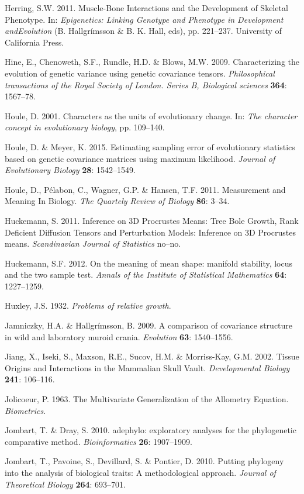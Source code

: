 \documentclass[12pt,twoside]{report}
\begin{document}
Herring, S.W. 2011. Muscle-Bone Interactions and the Development of
Skeletal Phenotype. In: \emph{Epigenetics: Linking Genotype and
Phenotype in Development andEvolution} (B. Hallgrímsson \& B. K. Hall,
eds), pp. 221--237. University of California Press.

Hine, E., Chenoweth, S.F., Rundle, H.D. \& Blows, M.W. 2009.
Characterizing the evolution of genetic variance using genetic
covariance tensors. \emph{Philosophical transactions of the Royal
Society of London. Series B, Biological sciences} \textbf{364}:
1567--78.

Houle, D. 2001. Characters as the units of evolutionary change. In:
\emph{The character concept in evolutionary biology}, pp. 109--140.

Houle, D. \& Meyer, K. 2015. Estimating sampling error of evolutionary
statistics based on genetic covariance matrices using maximum
likelihood. \emph{Journal of Evolutionary Biology} \textbf{28}:
1542--1549.

Houle, D., Pélabon, C., Wagner, G.P. \& Hansen, T.F. 2011. Measurement
and Meaning In Biology. \emph{The Quartely Review of Biology}
\textbf{86}: 3--34.

Huckemann, S. 2011. Inference on 3D Procrustes Means: Tree Bole Growth,
Rank Deficient Diffusion Tensors and Perturbation Models: Inference on
3D Procrustes means. \emph{Scandinavian Journal of Statistics} no--no.

Huckemann, S.F. 2012. On the meaning of mean shape: manifold stability,
locus and the two sample test. \emph{Annals of the Institute of
Statistical Mathematics} \textbf{64}: 1227--1259.

Huxley, J.S. 1932. \emph{Problems of relative growth}.

Jamniczky, H.A. \& Hallgrímsson, B. 2009. A comparison of covariance
structure in wild and laboratory muroid crania. \emph{Evolution}
\textbf{63}: 1540--1556.

Jiang, X., Iseki, S., Maxson, R.E., Sucov, H.M. \& Morriss-Kay, G.M.
2002. Tissue Origins and Interactions in the Mammalian Skull Vault.
\emph{Developmental Biology} \textbf{241}: 106--116.

Jolicoeur, P. 1963. The Multivariate Generalization of the Allometry
Equation. \emph{Biometrics}.

Jombart, T. \& Dray, S. 2010. adephylo: exploratory analyses for the
phylogenetic comparative method. \emph{Bioinformatics} \textbf{26}:
1907--1909.

Jombart, T., Pavoine, S., Devillard, S. \& Pontier, D. 2010. Putting
phylogeny into the analysis of biological traits: A methodological
approach. \emph{Journal of Theoretical Biology} \textbf{264}: 693--701.
\end{document}
